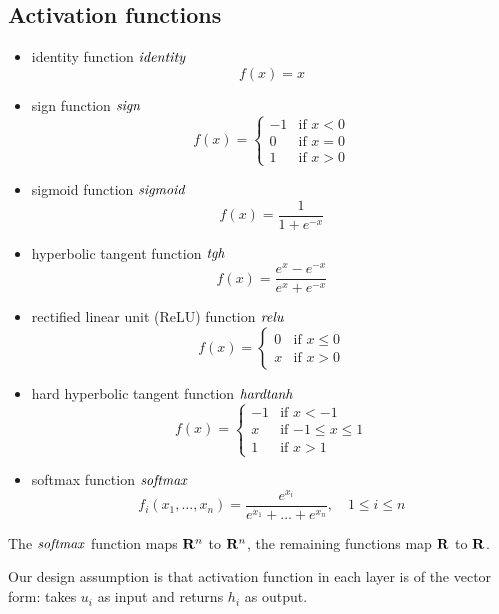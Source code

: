 \subsection{Activation functions}

\begin{itemize}
\item identity function $\mathit{identity}$
  \begin{equation} \label{eq:neuralnet_identity_af}
    f(x) = x
  \end{equation}
\item sign function $\mathit{sign}$
  \begin{equation} \label{eq:neuralnet_sign_af}
    f(x) =
    \begin{cases}
      -1 & \text{if $x < 0$} \\
      0 & \text{if $x = 0$} \\
      1 & \text{if $x > 0$}
    \end{cases}
  \end{equation}
\item sigmoid function $\mathit{sigmoid}$
  \begin{equation} \label{eq:neuralnet_sigmoid_af}
    f(x) = \frac{1}{1 + e^{-x}}
  \end{equation}
\item hyperbolic tangent function $\mathit{tgh}$
  \begin{equation} \label{eq:neuralnet_tgh_af}
    f(x) = \frac{e^x - e^{-x}}{e^x + e^{-x}}
  \end{equation}
\item rectified linear unit (ReLU) function $\mathit{relu}$
  \begin{equation} \label{eq:neuralnet_relu_af}
    f(x) =
    \begin{cases}
      0 & \text{if $x \leq 0$} \\
      x & \text{if $x > 0$}
    \end{cases}
  \end{equation}
\item hard hyperbolic tangent function $\mathit{hardtanh}$
  \begin{equation} \label{eq:neuralnet_hardtanh_af}
    f(x) =
    \begin{cases}
      -1 & \text{if $x < -1$} \\
      x & \text{if $-1 \leq x \leq 1$} \\
      1 & \text{if $x > 1$}
    \end{cases}
  \end{equation}
\item softmax function $\mathit{softmax}$
  \begin{equation} \label{eq:neuralnet_softmax_af}
    f_i(x_1, \ldots, x_n) =
    \frac{e^{x_i}}{e^{x_1} + \ldots + e^{x_n}},
    \quad 1 \leq i \leq n
  \end{equation}
\end{itemize}
The $\mathit{softmax}$ function maps $\mathbf{R}^n$ to $\mathbf{R}^n$, the
remaining functions map $\mathbf{R}$ to $\mathbf{R}$.

Our design assumption is that activation function in each layer is of
the vector form: takes $u_i$ as input and returns $h_i$ as output.
